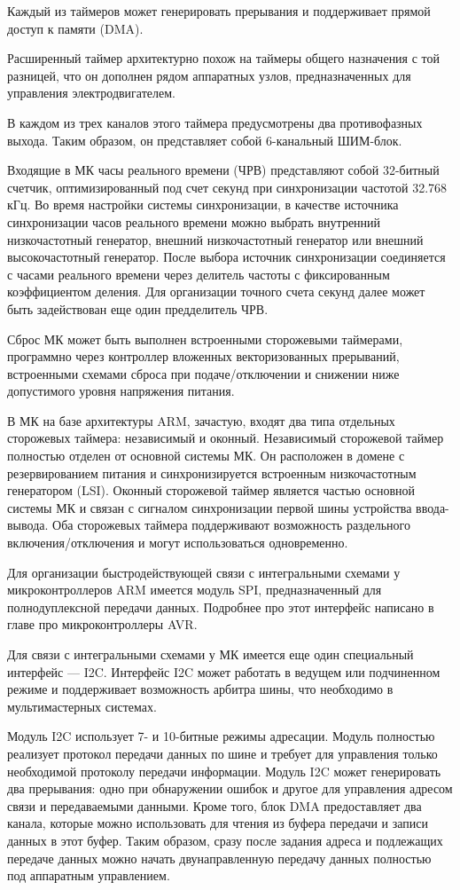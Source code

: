 \documentclass[12pt, oneside]{altsu-report}
\begin{document}
Каждый из таймеров может генерировать прерывания и поддерживает прямой доступ к памяти (DMA).

Расширенный таймер архитектурно похож на таймеры общего назначения с той разницей, что он дополнен рядом аппаратных узлов, предназначенных для управления электродвигателем.

В каждом из трех каналов этого таймера предусмотрены два противофазных выхода. Таким образом, он представляет собой 6-канальный ШИМ-блок.

Входящие в МК часы реального времени (ЧРВ) представляют собой 32-битный счетчик, оптимизированный под счет секунд при синхронизации частотой 32.768 кГц. Во время настройки системы синхронизации, в качестве источника синхронизации часов реального времени можно выбрать внутренний низкочастотный генератор, внешний низкочастотный генератор или внешний высокочастотный генератор. После выбора источник синхронизации соединяется с часами реального времени через делитель частоты с фиксированным коэффициентом деления. Для организации точного счета секунд далее может быть задействован еще один предделитель ЧРВ.

Сброс МК может быть выполнен встроенными сторожевыми таймерами, программно через контроллер вложенных векторизованных прерываний, встроенными схемами сброса при подаче/отключении и снижении ниже допустимого уровня напряжения питания.

В МК на базе архитектуры ARM, зачастую, входят два типа отдельных сторожевых таймера: независимый и оконный. Независимый сторожевой таймер полностью отделен от основной системы МК. Он расположен в домене с резервированием питания и синхронизируется встроенным низкочастотным генератором (LSI). Оконный сторожевой таймер является частью основной системы МК и связан с сигналом синхронизации первой шины устройства ввода-вывода. Оба сторожевых таймера поддерживают возможность раздельного включения/отключения и могут использоваться одновременно.

Для организации быстродействующей связи с интегральными схемами у микроконтроллеров ARM имеется модуль SPI, предназначенный для полнодуплексной передачи данных. Подробнее про этот интерфейс написано в главе про микроконтроллеры AVR.

Для связи с интегральными схемами у МК имеется еще один специальный интерфейс --- I2C. Интерфейс I2C может работать в ведущем или подчиненном режиме и поддерживает возможность арбитра шины, что необходимо в мультимастерных системах.

Модуль I2C использует 7- и 10-битные режимы адресации. Модуль полностью реализует протокол передачи данных по шине и требует для управления только необходимой протоколу передачи информации. Модуль I2C может генерировать два прерывания: одно при обнаружении ошибок и другое для управления адресом связи и передаваемыми данными. Кроме того, блок DMA предоставляет два канала, которые можно использовать для чтения из буфера передачи и записи данных в этот буфер. Таким образом, сразу после задания адреса и подлежащих передаче данных можно начать двунаправленную передачу данных полностью под аппаратным управлением.
\end{document}
